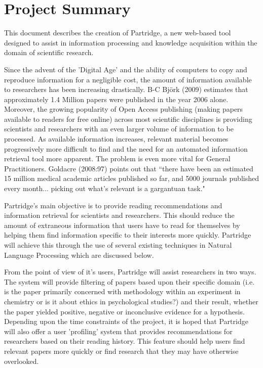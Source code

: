 \documentclass[12pt,a4paper]{article}
\begin{document}




\setlength{\parindent}{0pt}
\setlength{\parskip}{1.5ex plus 0.5ex minus 0.2ex}

\tableofcontents

\pagebreak

\section{Project Summary}

This document describes the creation of Partridge, a new web-based tool
designed to assist in information processing and knowledge acquisition within
the domain of scientific research.

Since the advent of the 'Digital Age' and the ability of computers to copy and
reproduce information for a negligible cost, the amount of information
available to researchers has been increasing drastically.  B-C Bj\"{o}rk (2009)
estimates that approximately 1.4 Million papers were published in the year 2006
alone\cite{bjork2009}. Moreover, the growing popularity of Open Access
publishing (making papers available to readers for free online\cite{Suber2012}) across
most scientific disciplines\cite{bjork2009}\cite{harnad2004comparing} is
providing scientists and researchers with an even larger volume of information to be
processed. As available information increases, relevant material becomes
progressively more difficult to find and the need for an automated information
retrieval tool more apparent. The problem is even more vital for General
Practitioners. Goldacre (2008:97) points out that ``there have been an
estimated 15 million medical academic articles published so far, and 5000
journals published every month... picking out what's relevant is a gargantuan
task."\cite{goldacre2008bad} 

Partridge's main objective is to provide reading recommendations and
information retrieval for scientists and researchers. This should reduce the
amount of extraneous information that users have to read for themselves by
helping them find information specific to their interests more quickly.
Partridge will achieve this through the use of several existing techniques in
Natural Language Processing which are discussed below.

From the point of view of it's users, Partridge will assist researchers in two
ways. The system will provide filtering of papers based upon their
specific domain (i.e. is the paper primarily concerned with methodology within
an experiment in chemistry or is it about ethics in psychological studies?) and
their result, whether the paper yielded positive, negative or inconclusive
evidence for a hypothesis. Depending upon the time constraints of the
project, it is hoped that Partridge will also offer a user 'profiling' system
that provides recommendations for researchers based on their reading history.
This feature should help users find relevant papers more quickly or find
research that they may have otherwise overlooked.
\end{document}
